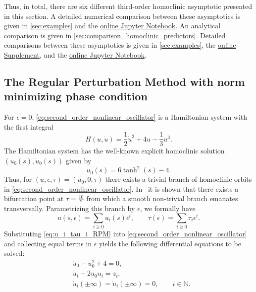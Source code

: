 Thus, in total, there are six different third-order homoclinic asymptotic
presented in this section.
\ifthesis
    A detailed numerical comparison between these asymptotics is given in
    \cref{sec:examples}
    and the
    \href{https://mmbosschaert.github.io/MatCont7p2NewInitBTHom-/}{online
    Jupyter Notebook}. 
    An analytical comparison is given in \cref{sec:comparison_homoclinic_predictors}.
\else
    Detailed comparisons between these asymptotics is given in
    \cref{sec:examples}, the \hyperref[mysupplement]{online Supplement},
    and the
    \href{https://mmbosschaert.github.io/MatCont7p2NewInitBTHom-/}{online
    Jupyter Notebook}. 
\fi

\subsection{The Regular Perturbation Method with norm minimizing phase condition}
\label{sec:RPM_norm_minimizing_phase condition}
For $\epsilon=0$, \cref{eq:second_order_nonlinear_oscillator} is a Hamiltonian
system with the first integral
\begin{equation*}
    H(u,\dot u) = \frac12 \dot u^2+4u-\frac13 u^3.
\end{equation*}
The Hamiltonian system has the well-known explicit homoclinic solution
$(u_0(s),\dot u_0(s))$ given by
\[
    u_{0}(s) = 6 \tanh^2(s) - 4.
\]
Thus, for $(u, \epsilon, \tau) = (u_0, 0, \tau)$ there exists a trivial branch
of homoclinic orbits in \cref{eq:second_order_nonlinear_oscillator}.
In~\cite{Beyn_1994} it is shown that there exists a bifurcation point at
$\tau=\frac{10}{7}$ from which a smooth non-trivial branch emanates
transversally. Parametrizing this branch by $\epsilon$, we formally have
\begin{equation}
    \label{eq:u_i_tau_i_RPM}
    u(s,\epsilon) = \sum_{i\geq 0} u_i(s) \epsilon^i, 
    \qquad 
    \tau(\epsilon) = \sum_{i\geq 0} \tau_i \epsilon^i.
\end{equation}
Substituting \cref{eq:u_i_tau_i_RPM} into
\cref{eq:second_order_nonlinear_oscillator} and collecting equal terms in
$\epsilon$ yields the following differential equations to be solved:
\begin{align}
  &\ddot u_0 - u_0^2 +4 = 0, \label{eq:z0} \\
  &\ddot u_i - 2 u_0 u_i
    =
    z_i, 
        \label{eq:regular_perturbation_method_equation_epsilon_i} \\
  &\dot u_i (\pm \infty) = \ddot u_i (\pm \infty) = 0,
        \qquad i\in \mathbb N. \nonumber
\end{align}
